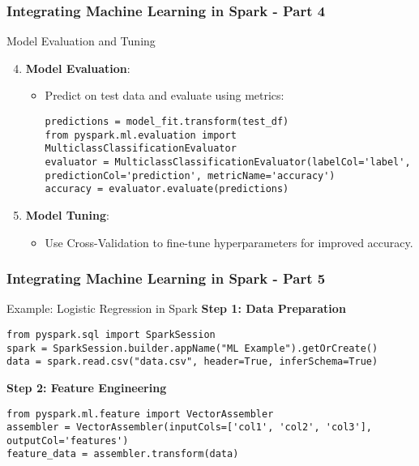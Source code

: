 \documentclass[aspectratio=169]{beamer}
\begin{document}
\begin{frame}[fragile]
    \frametitle{Integrating Machine Learning in Spark - Part 4}
    \begin{block}{Model Evaluation and Tuning}
        \begin{enumerate}
            \setcounter{enumi}{3}
            \item \textbf{Model Evaluation}:
                \begin{itemize}
                    \item Predict on test data and evaluate using metrics:
                    \begin{lstlisting}
predictions = model_fit.transform(test_df)
from pyspark.ml.evaluation import MulticlassClassificationEvaluator
evaluator = MulticlassClassificationEvaluator(labelCol='label', predictionCol='prediction', metricName='accuracy')
accuracy = evaluator.evaluate(predictions)
                    \end{lstlisting}
                \end{itemize}
            \item \textbf{Model Tuning}:
                \begin{itemize}
                    \item Use Cross-Validation to fine-tune hyperparameters for improved accuracy.
                \end{itemize}
        \end{enumerate}
    \end{block}
\end{frame}

\begin{frame}[fragile]
    \frametitle{Integrating Machine Learning in Spark - Part 5}
    \begin{block}{Example: Logistic Regression in Spark}
        \textbf{Step 1: Data Preparation}
        \begin{lstlisting}
from pyspark.sql import SparkSession
spark = SparkSession.builder.appName("ML Example").getOrCreate()
data = spark.read.csv("data.csv", header=True, inferSchema=True)
        \end{lstlisting}
        
        \textbf{Step 2: Feature Engineering}
        \begin{lstlisting}
from pyspark.ml.feature import VectorAssembler
assembler = VectorAssembler(inputCols=['col1', 'col2', 'col3'], outputCol='features')
feature_data = assembler.transform(data)
        \end{lstlisting}
    \end{block}
\end{frame}
\end{document}
